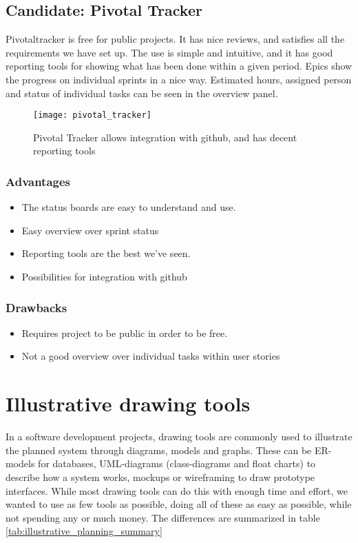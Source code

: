 \documentclass{report}
\begin{document}
\newpage
\subsection{Candidate: Pivotal Tracker}
Pivotaltracker\cite{website:pivotaltracker} is free for public projects. It has nice reviews, and satisfies all the requirements we have set up. The use is simple and intuitive, and it has good reporting tools for showing what has been done within a given period. Epics show the progress on individual sprints in a nice way. Estimated hours, assigned person and status of individual tasks can be seen in the overview panel.

\begin{figure}[H]
    \centering
    \texttt{[image: pivotal\_tracker]}
    \caption{Pivotal Tracker allows integration with github, and has decent reporting tools}  
    \label{fig:pivotal_tracker}
\end{figure}

\subsubsection{Advantages}
\begin{itemize}
\item The status boards are easy to understand and use.
\item Easy overview over sprint status
\item Reporting tools are the best we’ve seen.
\item Possibilities for integration with github 
\end{itemize}

\subsubsection{Drawbacks}
\begin{itemize}
\item Requires project to be public in order to be free.
\item Not a good overview over individual tasks within user stories
\end{itemize}

\newpage
\section{Illustrative drawing tools}

In a software development projects, drawing tools are commonly used to illustrate the planned system through diagrams, models and graphs. These can be ER-models for databases, UML-diagrams (class-diagrams and float charts) to describe how a system works, mockups or wireframing to draw prototype interfaces. While most drawing tools can do this with enough time and effort, we wanted to use as few tools as possible, doing all of these as easy as possible, while not spending any or much money. 
The differences are summarized in table \ref{tab:illustrative_planning_summary}
\end{document}
